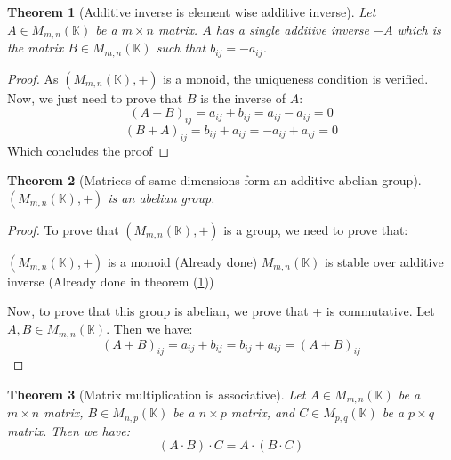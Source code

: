 \documentclass{article}
\newtheorem{theorem}{Theorem}[section]
\theoremstyle{definition}
\theoremstyle{remark}
\theoremstyle{example}
\begin{document}
\begin{theorem}[Additive inverse is element wise additive inverse] \label{thm:matrix-add-inv}
		Let $A \in M_{m,n}(\mathbb{K})$ be a $m \times n$ matrix. $A$ has a single additive inverse $-A$ which is the matrix $B \in M_{m,n}(\mathbb{K})$ such that $b_{ij} = -a_{ij}$.
\end{theorem}

\begin{proof}
		As $(M_{m,n}(\mathbb{K}), +)$ is a monoid, the uniqueness condition is verified. Now, we just need to prove that $B$ is the inverse of $A$:
				$$(A + B)_{ij} = a_{ij} + b_{ij} = a_{ij} - a_{ij} = 0$$
				$$(B + A)_{ij} = b_{ij} + a_{ij} = -a_{ij} + a_{ij} = 0$$
		Which concludes the proof
\end{proof}

\begin{theorem}[Matrices of same dimensions form an additive abelian group]
		$(M_{m,n}(\mathbb{K}), +)$ is an abelian group.
\end{theorem}

\begin{proof}
		To prove that $(M_{m,n}(\mathbb{K}), +)$ is a group, we need to prove that:
		\begin{outline}
				\1 $(M_{m,n}(\mathbb{K}), +)$ is a monoid (Already done)
				\1 $M_{m,n}(\mathbb{K})$ is stable over additive inverse (Already done in theorem (\ref{thm:matrix-add-inv}))
		\end{outline}
		Now, to prove that this group is abelian, we prove that + is commutative. Let $A, B \in M_{m,n}(\mathbb{K})$. Then we have:
				$$(A + B)_{ij} = a_{ij} + b_{ij} = b_{ij} + a_{ij} = (A + B)_{ij}$$
\end{proof}

\begin{theorem}[Matrix multiplication is associative]
    Let $A \in M_{m,n}(\mathbb{K})$ be a $m \times n$ matrix, $B \in M_{n,p}(\mathbb{K})$ be a $n \times p$ matrix, and $C \in M_{p,q}(\mathbb{K})$ be a $p \times q$ matrix. Then we have:
        $$(A \cdot B) \cdot C = A \cdot (B \cdot C)$$
\end{theorem}
\end{document}
